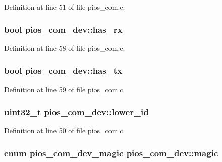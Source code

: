 \-Definition at line 51 of file pios\-\_\-com.\-c.

\hypertarget{structpios__com__dev_a0ef5c9630be8df13ab50070bbf65009c}{
\subsubsection[{has\-\_\-rx}]{\setlength{\rightskip}{0pt plus 5cm}bool {\bf pios\-\_\-com\-\_\-dev\-::has\-\_\-rx}}}\label{structpios__com__dev_a0ef5c9630be8df13ab50070bbf65009c}


\-Definition at line 58 of file pios\-\_\-com.\-c.

\hypertarget{structpios__com__dev_af723f3ee893a43d4ba3fff3e8ff6d3f7}{
\subsubsection[{has\-\_\-tx}]{\setlength{\rightskip}{0pt plus 5cm}bool {\bf pios\-\_\-com\-\_\-dev\-::has\-\_\-tx}}}\label{structpios__com__dev_af723f3ee893a43d4ba3fff3e8ff6d3f7}


\-Definition at line 59 of file pios\-\_\-com.\-c.

\hypertarget{structpios__com__dev_a3447468fdb0c7996c3669046d48b4cb6}{
\subsubsection[{lower\-\_\-id}]{\setlength{\rightskip}{0pt plus 5cm}uint32\-\_\-t {\bf pios\-\_\-com\-\_\-dev\-::lower\-\_\-id}}}\label{structpios__com__dev_a3447468fdb0c7996c3669046d48b4cb6}


\-Definition at line 50 of file pios\-\_\-com.\-c.

\hypertarget{structpios__com__dev_ac886360255eb683d1be8e60bde922e69}{
\subsubsection[{magic}]{\setlength{\rightskip}{0pt plus 5cm}enum {\bf pios\-\_\-com\-\_\-dev\-\_\-magic} {\bf pios\-\_\-com\-\_\-dev\-::magic}}}\label{structpios__com__dev_ac886360255eb683d1be8e60bde922e69}


